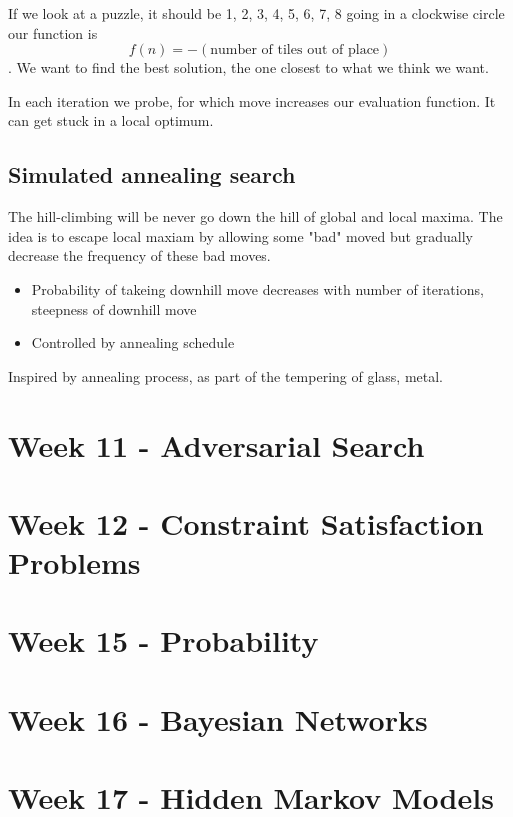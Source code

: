 \documentclass{article}
\begin{document}
If we look at a puzzle, it should be 1, 2, 3, 4, 5, 6, 7, 8 going in a clockwise
circle our function is $$f(n) = -(\text{number of tiles out of place})$$.
We want to find the best solution, the one closest to what we think we want.

In each iteration we probe, for which move increases our evaluation function.
It can get stuck in a local optimum.

\subsection{Simulated annealing search}
The hill-climbing will be never go down the hill of global and local maxima. 
The idea is to escape local maxiam by allowing some "bad" moved but gradually
decrease the frequency of these bad moves.
\begin{itemize}
  \item Probability of takeing downhill move decreases with number of
    iterations, steepness of downhill move
  \item Controlled by annealing schedule 
\end{itemize}
Inspired by annealing process, as part of the tempering of glass, metal.



\newpage
\section{Week 11 - Adversarial Search}%
\label{sub:_adversarial_search}


\newpage
\section{Week 12 - Constraint Satisfaction Problems}%
\label{sec:23_march_constraint_satisfaction_problems}



\newpage
\section{Week 15 - Probability}%
\label{sec:12_march_probability}

\newpage
\section{Week 16 - Bayesian Networks}%
\label{sec:20_march_bayesian_networks}

\newpage
\section{Week 17 - Hidden Markov Models}%
\label{sec:27_march_hidden_markov_models}
\end{document}
